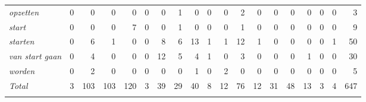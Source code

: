\begin{table}
{\begin{tabular}{>{\itshape}lrrrrrrrrrrrrrrrrrr}
opzetten &  0 &  0 &  0 &  0 &  0 &  0 &  1 &  0 &  0 &  0 &  2 &  0 &  0 &  0 &  0 &  0 &  0 &  3\\
start &  0 &  0 &  0 &  7 &  0 &  0 &  1 &  0 &  0 &  0 &  1 &  0 &  0 &  0 &  0 &  0 &  0 &  9\\
starten &  0 &  6 &  1 &  0 &  0 &  8 &  6 &  13 &  1 &  1 &  12 &  1 &  0 &  0 &  0 &  0 &  1 &  50\\
van start gaan &  0 &  4 &  0 &  0 &  0 &  12 &  5 &  4 &  1 &  0 &  3 &  0 &  0 &  0 &  1 &  0 &  0 &  30\\
worden &  0 &  2 &  0 &  0 &  0 &  0 &  0 &  1 &  0 &  2 &  0 &  0 &  0 &  0 &  0 &  0 &  0 &  5\\
\midrule
\normalfont Total  & 3 &  103 &  103 &  120 &  3 &  39 &  29 &  40 &  8 &  12 &  76 &  12 &  31 &  48 &  13 &  3 &  4 &  647\\
\lspbottomrule
\end{tabular}
}
\end{table} 

